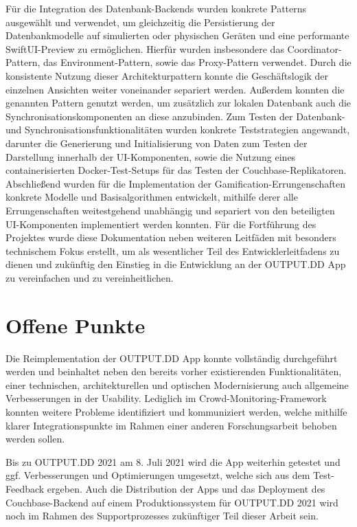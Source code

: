 \noindent Für die Integration des Datenbank-Backends wurden konkrete Patterns ausgewählt und verwendet, um gleichzeitig die Persistierung der Datenbankmodelle auf simulierten oder physischen Geräten und eine performante SwiftUI-Preview zu ermöglichen. Hierfür wurden insbesondere das Coordinator-Pattern, das Environment-Pattern, sowie das Proxy-Pattern verwendet. Durch die konsistente Nutzung dieser Architekturpattern konnte die Geschäftslogik der einzelnen Ansichten weiter voneinander separiert werden. Außerdem konnten die genannten Pattern genutzt werden, um zusätzlich zur lokalen Datenbank auch die Synchronisationskomponenten an diese anzubinden. Zum Testen der Datenbank- und Synchronisationsfunktionalitäten wurden konkrete Teststrategien angewandt, darunter die Generierung und Initialisierung von Daten zum Testen der Darstellung innerhalb der UI-Komponenten, sowie die Nutzung eines containerisierten Docker-Test-Setups für das Testen der Couchbase-Replikatoren. Abschließend wurden für die Implementation der Gamification-Errungenschaften konkrete Modelle und Basisalgorithmen entwickelt, mithilfe derer alle Errungenschaften weitestgehend unabhängig und separiert von den beteiligten UI-Komponenten implementiert werden konnten. Für die Fortführung des Projektes wurde diese Dokumentation neben weiteren Leitfäden mit besonders technischem Fokus erstellt, um als wesentlicher Teil des Entwicklerleitfadens zu dienen und zukünftig den Einstieg in die Entwicklung an der OUTPUT.DD App zu vereinfachen und zu vereinheitlichen.

\section{Offene Punkte}

Die Reimplementation der OUTPUT.DD App konnte vollständig durchgeführt werden und beinhaltet neben den bereits vorher existierenden Funktionalitäten, einer technischen, architekturellen und optischen Modernisierung auch allgemeine Verbesserungen in der Usability. Lediglich im Crowd-Monitoring-Framework konnten weitere Probleme identifiziert und kommuniziert werden, welche mithilfe klarer Integrationspunkte im Rahmen einer anderen Forschungsarbeit behoben werden sollen.

\noindent Bis zu OUTPUT.DD 2021 am 8. Juli 2021 wird die App weiterhin getestet und ggf. Verbesserungen und Optimierungen umgesetzt, welche sich aus dem Test-Feedback ergeben. Auch die Distribution der Apps und das Deployment des Couchbase-Backend auf einem Produktionssystem für OUTPUT.DD 2021 wird noch im Rahmen des Supportprozesses zukünftiger Teil dieser Arbeit sein.

